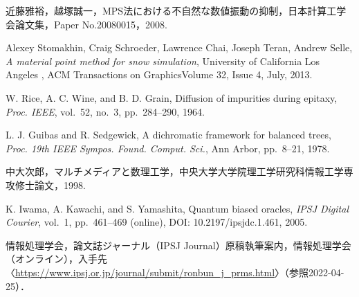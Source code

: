 \documentclass[a4j,12pt]{jreport}
\begin{document}
\begin{thebibliography}{99}

近藤雅裕，越塚誠一，MPS法における不自然な数値振動の抑制，日本計算工学会論文集，Paper No.20080015，2008. 

Alexey Stomakhin, Craig Schroeder, Lawrence Chai, Joseph Teran, Andrew Selle, \textit{A material point method for snow simulation}, University of California Los Angeles , ACM Transactions on GraphicsVolume 32, Issue 4, July, 2013.

W. Rice, A. C. Wine, and B. D. Grain, Diffusion of impurities during epitaxy, \textit{Proc. IEEE}, vol.~52, no.~3, pp.~284--290, 1964.

L. J. Guibas and R. Sedgewick, A dichromatic framework for balanced trees, 
\textit{Proc. 19th IEEE Sympos. Found. Comput. Sci.}, Ann Arbor, pp.~8--21, 1978.

中大次郎，マルチメディアと数理工学，中央大学大学院理工学研究科情報工学専攻修士論文，1998.

K. Iwama, A. Kawachi, and S. Yamashita, Quantum biased oracles, \textit{IPSJ Digital Courier}, vol.~1, pp.~461--469 (online), DOI: 10.2197/ipsjdc.1.461, 2005.

情報処理学会，論文誌ジャーナル（IPSJ Journal）原稿執筆案内，情報処理学会（オンライン），入手先〈\url{https://www.ipsj.or.jp/journal/submit/ronbun_j_prms.html}〉（参照2022-04-25）．


\end{thebibliography}

\end{document}
